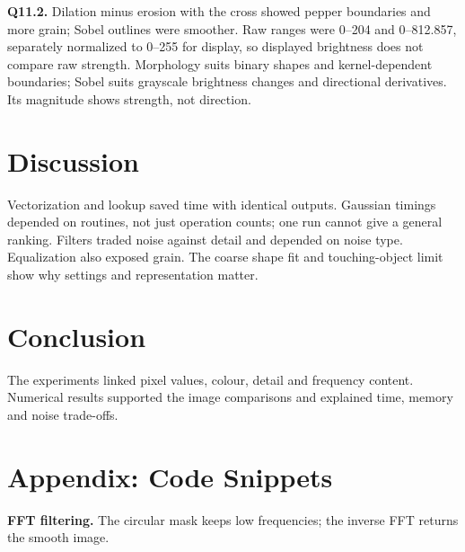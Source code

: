 \documentclass[10pt,a4paper]{article}
\begin{document}
\textbf{Q11.2.} Dilation minus erosion with the cross showed pepper boundaries
and more grain; Sobel outlines were smoother. Raw ranges were 0--204 and
0--812.857, separately normalized to 0--255 for display, so displayed brightness
does not compare raw strength. Morphology suits binary shapes and kernel-dependent
boundaries; Sobel suits grayscale brightness changes and directional derivatives.
Its magnitude shows strength, not direction.

\section{Discussion}
Vectorization and lookup saved time with identical outputs. Gaussian timings
depended on routines, not just operation counts; one run cannot give a general
ranking. Filters traded noise against detail and depended on noise type.
Equalization also exposed grain. The coarse shape fit and touching-object limit
show why settings and representation matter.

\section{Conclusion}
The experiments linked pixel values, colour, detail and frequency content.
Numerical results supported the image comparisons and explained time, memory
and noise trade-offs.

\section*{Appendix: Code Snippets}
\textbf{FFT filtering.} The circular mask keeps low frequencies; the inverse FFT returns the smooth image.

\end{document}
